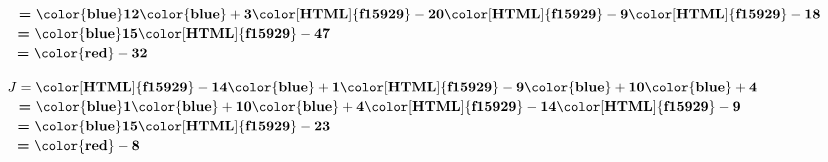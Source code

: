 \begin{corrige}
\begin{multicols}
\begin{list}{}
            $ \phantom{A }\textbf{=}~\mathbf{{\color{blue}12}}\mathbf{{\color{blue}+3}}\mathbf{{\color[HTML]{f15929}-20}}\mathbf{{\color[HTML]{f15929}-9}}\mathbf{{\color[HTML]{f15929}-18}}$\\
            $ \phantom{A }\textbf{=}~\mathbf{{\color{blue}15}}\mathbf{{\color[HTML]{f15929}-47}}$\\
            $ \phantom{A }\textbf{=}~\mathbf{{\color{red}-32}} $
            \item $ J = \mathbf{{\color[HTML]{f15929}-14}}\mathbf{{\color{blue}+1}}\mathbf{{\color[HTML]{f15929}-9}}\mathbf{{\color{blue}+10}}\mathbf{{\color{blue}+4}}$\\
            $ \phantom{A }\textbf{=}~\mathbf{{\color{blue}1}}\mathbf{{\color{blue}+10}}\mathbf{{\color{blue}+4}}\mathbf{{\color[HTML]{f15929}-14}}\mathbf{{\color[HTML]{f15929}-9}}$\\
            $ \phantom{A }\textbf{=}~\mathbf{{\color{blue}15}}\mathbf{{\color[HTML]{f15929}-23}}$\\
            $ \phantom{A }\textbf{=}~\mathbf{{\color{red}-8}} $
        \end{list}
    \end{multicols}
\end{corrige}